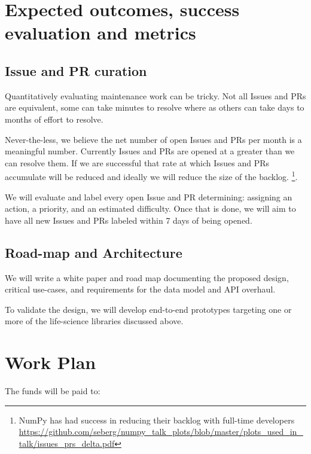 \documentclass[11pt]{article}  %
\begin{document}
\section{Expected outcomes, success evaluation and metrics}
\subsection{Issue and PR curation}

Quantitatively evaluating maintenance work can be tricky.  Not all
Issues and PRs are equivalent, some can take minutes to resolve where
as others can take days to months of effort to resolve.

Never-the-less, we believe the net number of open Issues and PRs per
month is a meaningful number.  Currently Issues and PRs are opened at
a greater than we can resolve them.  If we are successful that rate
at which Issues and PRs accumulate will be reduced and ideally we will
reduce the size of the backlog.
\footnote{NumPy has had success in reducing their backlog with full-time
developers \url{https://github.com/seberg/numpy\_talk\_plots/blob/master/plots\_used\_in\_talk/issues\_prs\_delta.pdf}}.


We will evaluate and label every open Issue and PR
determining: assigning an action, a priority, and an estimated
difficulty.  Once that is done, we will aim to have all new Issues and
PRs labeled within 7 days of being opened.


\subsection{Road-map and Architecture}

We will write a white paper and road map documenting the proposed
design, critical use-cases, and requirements for the data model and
API overhaul.

To validate the design, we will develop end-to-end prototypes
targeting one or more of the life-science libraries discussed above.


\section{Work Plan}

The funds will be paid to:
\end{document}
